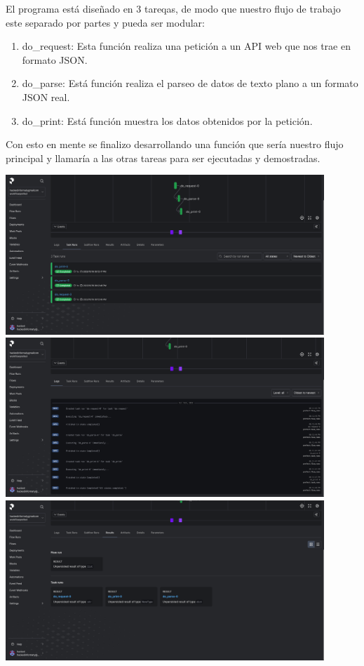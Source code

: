 \documentclass{dense_template}
\begin{document}
El programa está diseñado en 3 tareqas, de modo que nuestro flujo de trabajo este separado por partes y pueda ser modular:
\begin{enumerate}
    \item do\_request: Esta función realiza una petición a un API web que nos trae en formato JSON.
    \item do\_parse: Está función realiza el parseo de datos de texto plano a un formato JSON real.
    \item do\_print: Está función muestra los datos obtenidos por la petición.
\end{enumerate}

Con esto en mente se finalizo desarrollando una función que sería nuestro flujo principal y llamaría a las otras tareas para ser ejecutadas y demostradas.

 \begin{center}
    \includegraphics[width=0.9\textwidth]{1-workflow.png}
    \vspace{1cm}
    \includegraphics[width=0.9\textwidth]{2-workflow.png}
    \vspace{1cm}
    \includegraphics[width=0.9\textwidth]{3-workflow.png}
 \end{center}
\pagebreak
\end{document}
